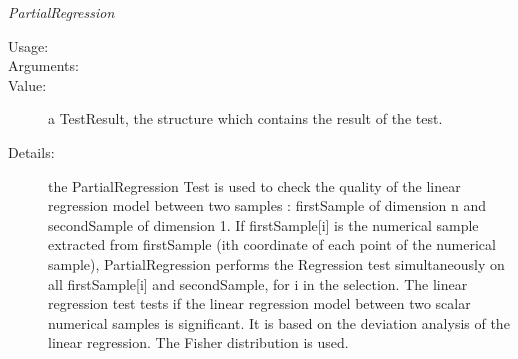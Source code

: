 \begin{description}
\begin{description}
\item \textit{PartialRegression}
\begin{description}
\item[Usage:] \rule{0pt}{1em}
\item[Arguments:] \rule{0pt}{1em}
\item[Value:]  a TestResult, the structure which contains the result of the test.
\item[Details:] the PartialRegression Test is used to check the quality of the linear regression model between two samples : firstSample of dimension n and secondSample of dimension 1. If firstSample[i] is the numerical sample extracted from firstSample (ith coordinate of each point of the numerical sample), PartialRegression performs the Regression test simultaneously on all firstSample[i] and secondSample, for i in the selection. The linear regression test tests if the linear regression model between two scalar numerical samples is significant. It is based on the deviation analysis of the linear regression. The Fisher distribution is used.
\end{description}
\bigskip


\end{description}
\end{description}
